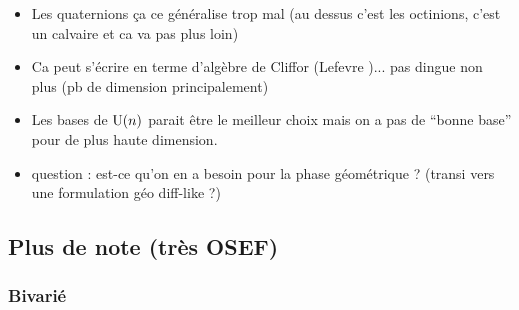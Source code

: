 \begin{itemize}
	\item Les quaternions ça ce généralise trop mal (au dessus c'est les octinions, c'est un calvaire et ca va pas plus loin)
	
	\item Ca peut s'écrire en terme d'algèbre de Cliffor (Lefevre \cite{lefevre_polarization_2021})... pas dingue non plus (pb de dimension principalement)
	
	\item Les bases de $\text{\normalfont U}(n)$ parait être le meilleur choix mais on a pas de ``bonne base'' pour de plus haute dimension.
	
	\item question : est-ce qu'on en a besoin pour la phase géométrique ? (transi vers une formulation géo diff-like ?)
\end{itemize}

\subsection{Plus de note (très OSEF)} 

\subsubsection{Bivarié}

